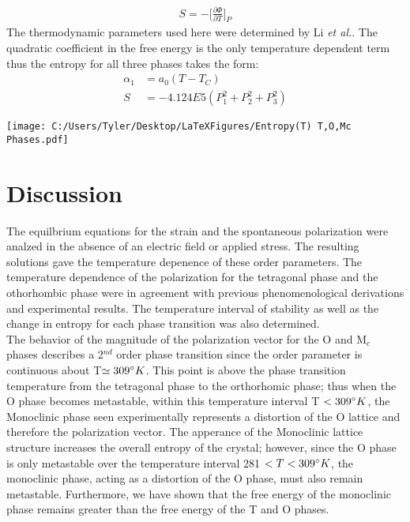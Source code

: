 \documentclass{article}
\begin{document}
\begin{align}
S=- \Big[ \frac{\partial \Phi}{\partial T}\Big] _P
\end{align}
The thermodynamic parameters used here were determined by Li \textit{et al.}.  The quadratic coefficient in the free energy is the only temperature dependent term thus the entropy for all three phases takes the form:
\begin{align}
\alpha_1 &=a_0(T-T_C) \\
S &= -4.124E5(P_1^2+P_2^2+P_3^2)
\end{align}

\texttt{[image: C:/Users/Tyler/Desktop/LaTeXFigures/Entropy(T) T,O,Mc Phases.pdf]}


\newpage
\section{Discussion}
\justify

\indent 	The equilbrium equations for the strain and the spontaneous polarization were analzed in the absence of an electric field or applied stress.  The resulting solutions gave the temperature depenence of these order parameters.  The temperature dependence of the polarization for the tetragonal phase and the othorhombic phase were in agreement with previous phenomenological derivations and experimental results.  The temperature interval of stability as well as the change in entropy for each phase transition was also determined. \\
\indent 	The behavior of the magnitude of the polarization vector for the O and M$_c$ phases describes a 2$^{nd}$ order phase transition since the order parameter is continuous about T$ \simeq 309 \degree K $.  This point is above the phase transition temperature from the tetragonal phase to the orthorhomic phase; thus when the O phase becomes metastable, within this temperature interval T $ < 309 \degree K $, the Monoclinic phase seen experimentally represents a distortion of the O lattice and therefore the polarization vector. The apperance of the Monoclinic lattice structure increases the overall entropy of the crystal; however, since the O phase is only metastable over the temperature interval 281 $ < T < 309 \degree K$, the monoclinic phase, acting as a distortion of the O phase, must also remain metastable.  Furthermore, we have shown that the free energy of the monoclinic phase remains greater than the free energy of the T and O phases. \\
\end{document}
